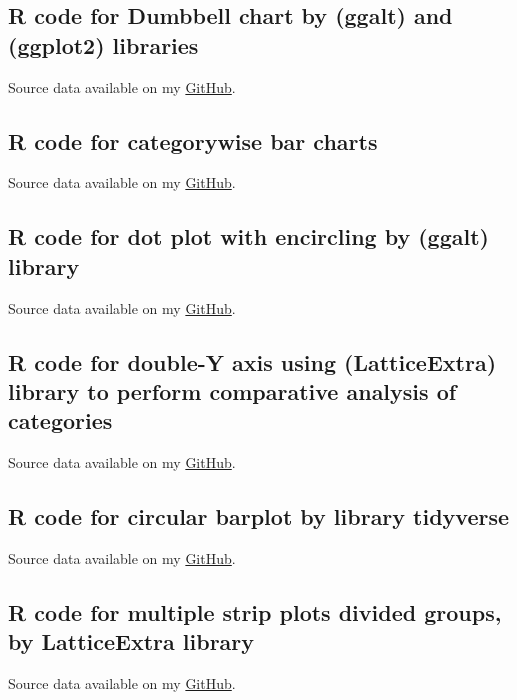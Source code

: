 \documentclass[11pt,a4paper]{report}
\begin{document}
{\begin{appendices}
\subsection{R code for Dumbbell chart by (ggalt) and (ggplot2) libraries}\label{R:12}
Source data available on my \href{https://github.com/paulinelemenkova/R-11-Dumbbell-Charts}{GitHub}.

\pagebreak

\subsection{R code for categorywise bar charts}\label{R:13}
Source data available on my \href{https://github.com/paulinelemenkova/R-12-Categorywise-Bar-Chart}{GitHub}.

\pagebreak

\subsection{R code for dot plot with encircling by (ggalt) library}\label{R:14}
Source data available on my \href{https://github.com/paulinelemenkova/R-13-Dotplot-with-Encircling}{GitHub}.


\subsection{R code for double-Y axis using (LatticeExtra) library to perform comparative analysis of categories}\label{R:15}
Source data available on my \href{https://github.com/paulinelemenkova/R-14-Double-Y-Axis}{GitHub}.


\subsection{R code for circular barplot by library tidyverse}\label{R:16}
Source data available on my \href{https://github.com/paulinelemenkova/R-15-Circular-Barplot}{GitHub}.

\pagebreak

\subsection{R code for multiple strip plots divided groups, by LatticeExtra library}\label{R:17}
Source data available on my \href{https://github.com/paulinelemenkova/R-16_Strip-Plot-by-Groups}{GitHub}.



\end{appendices}}
\end{document}
